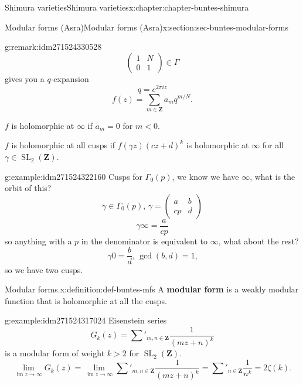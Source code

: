 \documentclass[oneside,10pt,]{book}
\newcommand{\terminology}[1]{\textbf{#1}}
\numberwithin{equation}{section}
\newcommand{\ZZ}{\mathbf{Z}}
\DeclareMathOperator{\im}{im}
\DeclareMathOperator{\SL}{SL}
\newcommand{\lt}{<}
\newcommand{\gt}{>}
\newcommand{\amp}{&}
\begin{document}
\begin{chapterptx}{Shimura varieties}{}{Shimura varieties}{}{}{x:chapter:chapter-buntes-shimura}
\begin{sectionptx}{Modular forms (Asra)}{}{Modular forms (Asra)}{}{}{x:section:sec-buntes-modular-forms}
\begin{remark}{}{g:remark:idm271524330528}
\begin{equation*}
\begin{pmatrix} 1\amp N \\ 0 \amp 1 \end{pmatrix} \in \Gamma
\end{equation*}
gives you a \(q\)-expansion%
\begin{equation*}
q=  e^{2\pi i z}
\end{equation*}
%
\begin{equation*}
f(z) = \sum_{m\in \ZZ} a_m  q^{m/N}\text{.}
\end{equation*}
%
\par
\(f\) is holomorphic at \(\infty\) if \(a_m  = 0\) for \(m \lt 0\).%
\par
\(f\) is holomorphic at all cusps if \(f(\gamma z)(cz+d)^k\) is holomorphic at \(\infty\) for all \(\gamma \in \SL_2(\ZZ)\).%
\end{remark}
\begin{example}{}{g:example:idm271524322160}%
Cusps for \(\Gamma_0(p)\), we know we have \(\infty\), what is the orbit of this?%
\begin{equation*}
\gamma\in \Gamma_0(p),\, \gamma  =  \begin{pmatrix} a\amp b \\ cp \amp d    \end{pmatrix}
\end{equation*}
%
\begin{equation*}
\gamma \infty  = \frac{a}{cp}
\end{equation*}
so anything with  a \(p\) in the denominator is equivalent to \(\infty\), what about the rest?%
\begin{equation*}
\gamma 0  = \frac{b}{d}, \, \gcd(b,d)  =1\text{,}
\end{equation*}
so we have two cusps.%
\end{example}
\begin{definition}{Modular forms.}{x:definition:def-buntes-mfs}%
A \terminology{modular form} is  a weakly modular function that is holomorphic at all the cusps.%
\end{definition}
\begin{example}{}{g:example:idm271524317024}%
Eisenstein series%
\begin{equation*}
G_k(z) = \sum'_{m,n\in \ZZ} \frac{1}{(mz+n)^k}
\end{equation*}
is a modular form of weight \(k \gt 2\) for \(\SL_2(\ZZ)\).%
\begin{equation*}
\lim_{\im z\to \infty} G_k(z) = \lim_{\im z\to \infty} \sum'_{m,n\in \ZZ} \frac{1}{(mz+n)^k} = \sum'_{n\in \ZZ} \frac{1}{n^k} = 2\zeta(k)\text{.}

\end{equation*}
\end{example}
\end{sectionptx}
\end{chapterptx}
\end{document}
